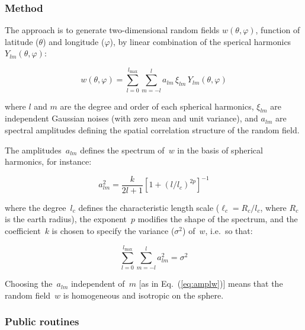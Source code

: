\documentclass[11pt]{article}
\begin{document}
\subsubsection*{Method}

The approach is to generate two-dimensional random fields $w(\theta,\varphi)$,
function of latitude ($\theta$) and longitude ($\varphi$),
by linear combination of the sperical harmonics $Y_{lm}(\theta,\varphi)$:

\begin{equation}
\label{eq:ranw}
w(\theta,\varphi) = \sum_{l=0}^{l_{\max}} \sum_{m=-l}^l
                    a_{lm} \, \xi_{lm} \, Y_{lm}(\theta,\varphi)
\end{equation}

\noindent
where $l$ and $m$ are the degree and order of each spherical harmonics,
$\xi_{lm}$ are independent Gaussian noises (with zero mean and unit variance),
and $a_{lm}$ are spectral amplitudes defining the spatial
correlation structure of the random field.

The amplitudes~$a_{lm}$ defines the spectrum of~$w$
in the basis of spherical harmonics, for instance:

\begin{equation}
\label{eq:amplw}
a^2_{lm} = \frac{k}{2l+1} \left[ 1 + \left( l/l_c \right)^{2p} \right]^{-1}
\end{equation}

\noindent
where the degree~$l_c$ defines the characteristic length scale
($\ell_c=R_c/l_c$, where $R_c$ is the earth radius),
the exponent~$p$ modifies the shape of the spectrum, and
the coefficient~$k$ is chosen to specify the variance ($\sigma^2$) of~$w$,
i.e.\ so that:

\begin{equation}
\label{eq:amplw-norm}
\sum_{l=0}^{l_{\max}} \sum_{m=-l}^l a^2_{lm} = \sigma^2
\end{equation}

\noindent
Choosing the~$a_{lm}$ independent of~$m$ [as in Eq.~(\ref{eq:amplw})]
means that the random field~$w$ is homogeneous and isotropic on the sphere.

\subsubsection*{Public routines}
\end{document}
